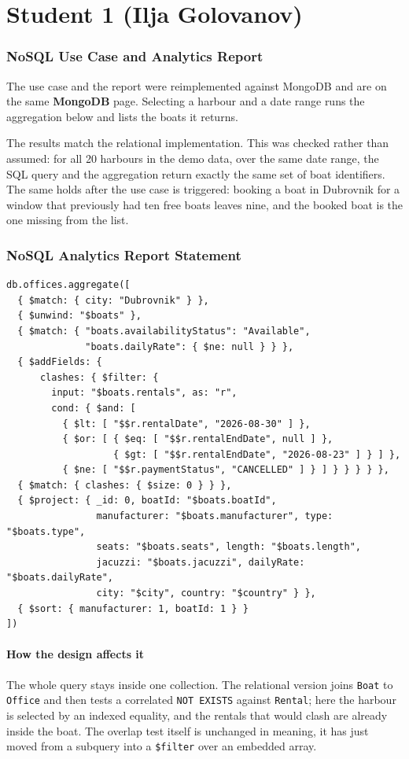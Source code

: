 \documentclass[a4paper, 11pt]{article}          %
\begin{document}
\section*{Student 1 (Ilja Golovanov)}
\subsubsection{NoSQL Use Case and Analytics Report}

The use case and the report were reimplemented against MongoDB and are on the
same \textbf{MongoDB} page. Selecting a harbour and a date range runs the
aggregation below and lists the boats it returns.

The results match the relational implementation. This was checked rather than
assumed: for all 20 harbours in the demo data, over the same date range, the SQL
query and the aggregation return exactly the same set of boat identifiers. The
same holds after the use case is triggered: booking a boat in Dubrovnik for a
window that previously had ten free boats leaves nine, and the booked boat is
the one missing from the list.

\subsubsection{NoSQL Analytics Report Statement}

\begin{lstlisting}
db.offices.aggregate([
  { $match: { city: "Dubrovnik" } },
  { $unwind: "$boats" },
  { $match: { "boats.availabilityStatus": "Available",
              "boats.dailyRate": { $ne: null } } },
  { $addFields: {
      clashes: { $filter: {
        input: "$boats.rentals", as: "r",
        cond: { $and: [
          { $lt: [ "$$r.rentalDate", "2026-08-30" ] },
          { $or: [ { $eq: [ "$$r.rentalEndDate", null ] },
                   { $gt: [ "$$r.rentalEndDate", "2026-08-23" ] } ] },
          { $ne: [ "$$r.paymentStatus", "CANCELLED" ] } ] } } } } },
  { $match: { clashes: { $size: 0 } } },
  { $project: { _id: 0, boatId: "$boats.boatId",
                manufacturer: "$boats.manufacturer", type: "$boats.type",
                seats: "$boats.seats", length: "$boats.length",
                jacuzzi: "$boats.jacuzzi", dailyRate: "$boats.dailyRate",
                city: "$city", country: "$country" } },
  { $sort: { manufacturer: 1, boatId: 1 } }
])
\end{lstlisting}

\paragraph{How the design affects it} The whole query stays inside one
collection. The relational version joins \texttt{Boat} to \texttt{Office} and
then tests a correlated \texttt{NOT EXISTS} against \texttt{Rental}; here the
harbour is selected by an indexed equality, and the rentals that would clash are
already inside the boat. The overlap test itself is unchanged in meaning, it has
just moved from a subquery into a \texttt{\$filter} over an embedded array.
\end{document}
